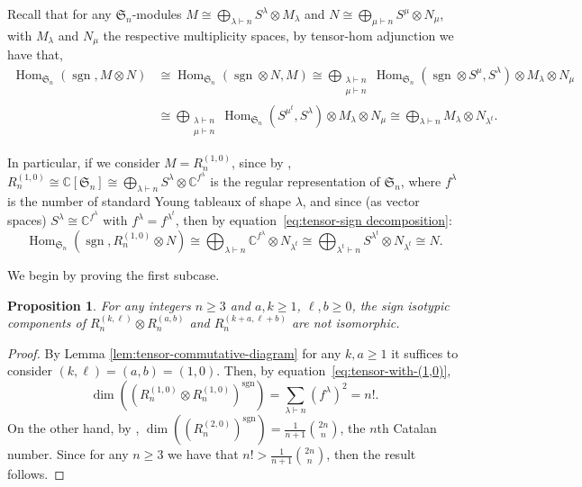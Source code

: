 \documentclass[11pt, reqno]{amsart}
\newtheorem{proposition}[theorem]{Proposition}
\theoremstyle{definition}
\theoremstyle{remark}
\numberwithin{equation}{section}
\newcommand{\0}{\emptyset}
\newcommand{\C}{\mathbb{C}}
\renewcommand{\S}{\mathfrak{S}}
\DeclareMathOperator{\sgn}{sgn}
\DeclareMathOperator{\Hom}{Hom}
\begin{document}
Recall that for any $\S_n$-modules $M \cong \bigoplus_{\lambda \vdash n} S^\lambda \otimes M_\lambda$ and $N \cong \bigoplus_{\mu \vdash n} S^\mu \otimes N_\mu$, with $M_\lambda$ and $N_\mu$ the respective multiplicity spaces, 
by tensor-hom adjunction we have that,
\begin{equation}
    \label{eq:tensor-sign decomposition}
    \begin{aligned} 
        \Hom_{\S_n}\left( \sgn, M \otimes N\right) 
        &\cong \Hom_{\S_n}\left( \sgn \otimes N, M \right) 
        \cong \bigoplus_{\substack{\lambda \vdash n \\ \mu \vdash n}} 
        \Hom_{\S_n}\left( \sgn \otimes S^\mu, S^\lambda \right)  \otimes M_\lambda \otimes N_\mu \\ 
        &\cong \bigoplus_{\substack{\lambda \vdash n \\ \mu \vdash n}} 
        \Hom_{\S_n}\left( S^{\mu^t}, S^\lambda \right) \otimes M_\lambda \otimes N_\mu 
        \cong \bigoplus_{\lambda \vdash n} M_\lambda \otimes N_{\lambda^t}.
    \end{aligned}
\end{equation}

In particular, if we consider $M = R_n^{(1,0)}$, 
since by \cite{Chevalley}, 
$R_n^{(1,0)} \cong \C[\S_n] \cong \bigoplus_{\lambda \vdash n} S^{\lambda}\otimes \C^{f^\lambda}$ 
is the regular representation of $\S_n$, 
where $f^\lambda$ is the number of standard Young tableaux of shape $\lambda$, 
and since (as vector spaces) $S^\lambda \cong \C^{f^\lambda}$ with $f^\lambda = f^{\lambda^t}$, 
then by equation~\eqref{eq:tensor-sign decomposition}:
\begin{equation}
    \label{eq:tensor-with-(1,0)}
    \Hom_{\S_n}\left( \sgn, R_n^{(1,0)} \otimes N\right) 
    \cong 
    \bigoplus_{\lambda \vdash n} \C^{f^\lambda} \otimes N_{\lambda^t}
    \cong \bigoplus_{\lambda^t \vdash n} S^{\lambda^t} \otimes N_{\lambda^t} \cong N. 
\end{equation}

We begin by proving the first subcase. 

\begin{proposition} \label{prop:(1,0)x(1,0)}
    For any integers $n\geq 3$ and $a,k\geq 1$, $\ell,b\geq0$, the sign isotypic components of $R_n^{(k,\ell)} \otimes R_n^{(a,b)}$ and $R_n^{(k+a, \ell+b)}$ are not isomorphic. 
\end{proposition}

\begin{proof}
    By Lemma \ref{lem:tensor-commutative-diagram} for any $k,a \geq 1$ 
    it suffices to consider $(k,\ell)=(a,b)=(1,0)$.
    Then, by equation~\eqref{eq:tensor-with-(1,0)},
    \[
        \dim\left( \left(R_n^{(1,0)} \otimes R_n^{(1,0)}\right)^{\sgn}\right) 
        = \sum_{\lambda \vdash n} \left(f^\lambda \right)^2= n!.
    \]
    On the other hand, by \cite{Haiman2002}, 
    $\dim \left( \left(R_n^{(2,0)}\right)^{\sgn}\right) =\frac{1}{n+1}\binom{2n}{n}$, 
    the $n$th Catalan number. Since for any $n\geq 3$ we have that 
    $n!>\frac{1}{n+1}\binom{2n}{n}$, then the result follows.
\end{proof}
\end{document}
